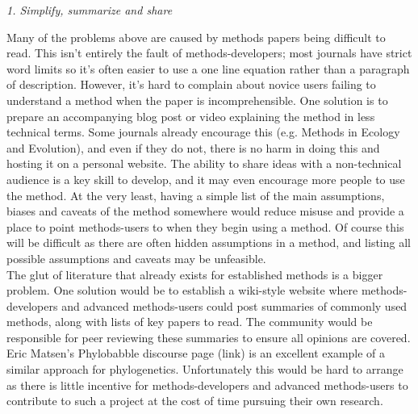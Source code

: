 \documentclass[a4paper,12pt]{article}
\renewcommand{\subsection}[1]{
  \bigskip
  \begin{center}
  \begin{large}
  \normalfont\itshape #1
  \end{large}
  \end{center}
}
\begin{document}
\subsection{1. Simplify, summarize and share}
Many of the problems above are caused by methods papers being difficult to read. 
This isn't entirely the fault of methods-developers; most journals have strict word limits so it's often easier to use a one line equation rather than a paragraph of description. 
However, it's hard to complain about novice users failing to understand a method when the paper is incomprehensible. %
One solution is to prepare an accompanying blog post or video explaining the method in less technical terms. 
Some journals already encourage this (e.g. Methods in Ecology and Evolution), and even if they do not, there is no harm in doing this and hosting it on a personal website. 
The ability to share ideas with a non-technical audience is a key skill to develop, and it may even encourage more people to use the method. 
At the very least, having a simple list of the main assumptions, biases and caveats of the method somewhere would reduce misuse and provide a place to point methods-users to when they begin using a method.
Of course this will be difficult as there are often hidden assumptions in a method, and listing all possible assumptions and caveats may be unfeasible.\\


The glut of literature that already exists for established methods is a bigger problem. 
One solution would be to establish a wiki-style website where methods-developers and advanced methods-users could post summaries of commonly used methods, along with lists of key papers to read. 
The community would be responsible for peer reviewing these summaries to ensure all opinions are covered. 
Eric Matsen's Phylobabble discourse page (link) is an excellent example of a similar approach for phylogenetics. Unfortunately this would be hard to arrange as there is little incentive for methods-developers and advanced methods-users to contribute to such a project at the cost of time pursuing their own research.\\
\end{document}
